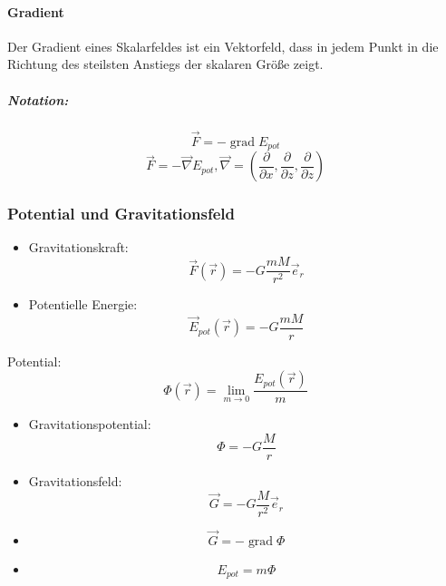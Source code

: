 \documentclass[a4paper]{scrartcl}
\DeclareMathOperator{\grad}{grad}
\renewcommand{\v}[1]{\vec{#1}}
\begin{document}
\paragraph{Gradient}
\label{sec-9-9-4-6}
Der Gradient eines Skalarfeldes ist ein Vektorfeld, dass in jedem Punkt in die Richtung des steilsten Anstiegs der skalaren Größe zeigt.
\subparagraph{Notation:}
\label{sec-9-9-4-6-1}
\[\v F = -\grad E_{pot}\]
\[\v F = - \v \nabla E_{pot}, \v \nabla = (\frac{\partial}{\partial x}, \frac{\partial}{\partial z}, \frac{\partial}{\partial z})\]
\subsubsection{Potential und Gravitationsfeld}
\label{sec-9-9-5}
\begin{itemize}
\item Gravitationskraft: \[\v F(\v r) = -G\frac{mM}{r^2}\v e_r\]
\item Potentielle Energie: \[\v E_{pot}(\v r) = -G\frac{mM}{r}\]
\end{itemize}
Potential:
\[\Phi(\v r) = \lim_{m \to 0} \frac{E_{pot}(\v r)}{m}\]
\begin{itemize}
\item Gravitationspotential: \[\Phi = -G\frac{M}{r}\]
\item Gravitationsfeld: \[\v G = -G \frac{M}{r^2}\v e_r\]
\item \[\v G = -\grad \Phi\]
\item \[E_{pot} = m\Phi\]
\end{itemize}
\end{document}

